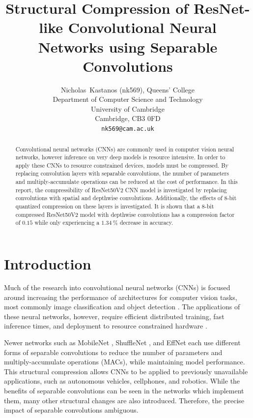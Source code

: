 \documentclass{article}
\title{Structural Compression of ResNet-like Convolutional Neural Networks using Separable Convolutions}
\author{%
	Nicholas~Kastanos (nk569), Queens' College \\
	Department of Computer Science and Technology\\
	University of Cambridge\\
	Cambridge, CB3 0FD\\
	\texttt{nk569@cam.ac.uk} \\
}
\begin{document}
	
	\maketitle
	
	\begin{abstract}
		Convolutional neural networks (CNNs) are commonly used in computer vision neural networks, however inference on very deep models is resource intensive. In order to apply these CNNs to resource constrained devices, models must be compressed. By replacing convolution layers with separable convolutions, the number of parameters and multiply-accumulate operations can be reduced at the cost of performance. In this report, the compressibility of ResNet50V2 CNN model is investigated by replacing convolutions with spatial and depthwise convolutions. Additionally, the effects of 8-bit quantized compression on these layers is investigated. It is shown that a 8-bit compressed ResNet50V2 model with depthwise convolutions has a compression factor of $0.15$ while only experiencing a $1.34~\%$ decrease in accuracy.
	\end{abstract}
	
	\section{Introduction}
	
	Much of the research into convolutional neural networks (CNNs) is focused around increasing the performance of architectures for computer vision tasks, most commonly image classification and object detection \cite{resnetv1, vgg, yolo, inception, adscnet}. The applications of these neural networks, however, require efficient distributed training, fast inference times, and deployment to resource constrained hardware \cite{scalable8bit,mobilenet}. 
	
	Newer networks such as MobileNet \cite{mobilenet}, ShuffleNet \cite{shufflenet}, and EffNet \cite{effnet} each use different forms of separable convolutions to reduce the number of parameters and multiply-accumulate operations (MACs), while maintaining model performance. This structural compression allows CNNs to be applied to previously unavailable applications, such as autonomous vehicles, cellphones, and robotics.	While the benefits of separable convolutions can be seen in the networks which implement them, many other structural changes are also introduced. Therefore, the precise impact of separable convolutions ambiguous.
	
\end{document}
